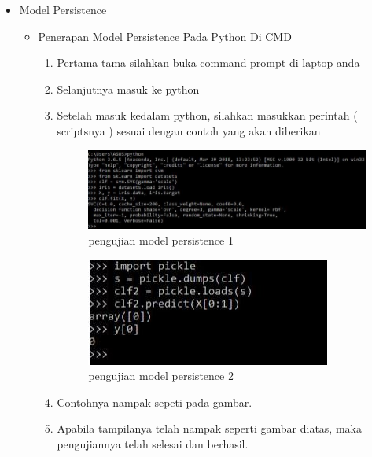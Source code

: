 \par
\begin{itemize}
\item Model Persistence
\begin{itemize}
\item Penerapan Model Persistence Pada Python Di CMD
\begin{enumerate}
\item Pertama-tama silahkan buka command prompt di laptop anda
\item Selanjutnya masuk ke python 
\item Setelah masuk kedalam python, silahkan masukkan perintah ( scriptsnya ) sesuai dengan contoh yang akan diberikan

\begin{figure}[ht]
\centering
\includegraphics[scale=0.3]{figures/modelpre1.jpg}
\caption{pengujian model persistence 1 }
\label{contoh}
\end{figure}

\par

\par

\begin{figure}[ht]
\centering
\includegraphics[scale=0.4]{figures/modelpre2.jpg}
\caption{pengujian model persistence 2 }
\label{contoh}
\end{figure}

\par
\item Contohnya nampak sepeti pada gambar.
\item Apabila tampilanya telah nampak seperti gambar diatas, maka pengujiannya telah selesai dan berhasil.
\end{enumerate}


\end{itemize}
\end{itemize}
